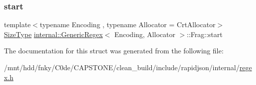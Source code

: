 \subsubsection{\texorpdfstring{start}{start}}
{\footnotesize\ttfamily template$<$typename Encoding , typename Allocator  = Crt\+Allocator$>$ \\
\hyperlink{rapidjson_8h_a5ed6e6e67250fadbd041127e6386dcb5}{Size\+Type} \hyperlink{classinternal_1_1GenericRegex}{internal\+::\+Generic\+Regex}$<$ Encoding, Allocator $>$\+::Frag\+::start}



The documentation for this struct was generated from the following file\+:\begin{DoxyCompactItemize}
\item 
/mnt/hdd/fnky/\+C0de/\+C\+A\+P\+S\+T\+O\+N\+E/clean\+\_\+build/include/rapidjson/internal/\hyperlink{regex_8h}{regex.\+h}\end{DoxyCompactItemize}
